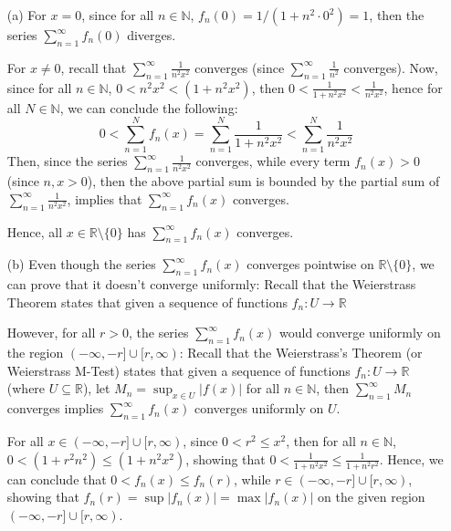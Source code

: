 \documentclass{article}
\begin{document}
\begin{itemize}
    \item[(a)] For $x=0$, since for all $n\in\mathbb{N}$, $f_n(0)=1/(1+n^2\cdot 0^2)=1$, then the series $\sum_{n=1}^{\infty} f_n(0)$ diverges.
    
    \hfill
    
    For $x\neq 0$, recall that $\sum_{n=1}^{\infty}\frac{1}{n^2x^2}$ converges (since $\sum_{n=1}^{\infty}\frac{1}{n^2}$ converges).
    Now, since for all $n\in\mathbb{N}$, $0< n^2x^2 < (1+n^2x^2)$, then $0<\frac{1}{1+n^2x^2}<\frac{1}{n^2x^2}$, hence for all $N\in\mathbb{N}$, we can conclude the following:
    $$0 < \sum_{n=1}^{N}f_n(x)=\sum_{n=1}^{N}\frac{1}{1+n^2x^2}<\sum_{n=1}^{N}\frac{1}{n^2x^2}$$
    Then, since the series $\sum_{n=1}^{\infty}\frac{1}{n^2x^2}$ converges, while every term $f_n(x)>0$ (since $n,x>0$), then the above partial sum is bounded by the partial sum of $\sum_{n=1}^{\infty}\frac{1}{n^2x^2}$,
    implies that $\sum_{n=1}^{\infty}f_n(x)$ converges.

    Hence, all $x\in \mathbb{R}\setminus\{0\}$ has $\sum_{n=1}^{\infty}f_n(x)$ converges.
    
    \hfill
    
    \item[(b)] Even though the series $\sum_{n=1}^{\infty}f_n(x)$ converges pointwise on $\mathbb{R}\setminus\{0\}$, we can prove that it doesn't converge uniformly:
    Recall that the Weierstrass Theorem states that given a sequence of functions $f_n:U\rightarrow\mathbb{R}$

    \hfill

    However, for all $r>0$, the series $\sum_{n=1}^{\infty}f_n(x)$ would converge uniformly on the region $(-\infty,-r]\cup [r,\infty)$:
    Recall that the Weierstrass's Theorem (or Weierstrass M-Test) states that given a sequence of functions $f_n:U\rightarrow\mathbb{R}$ (where $U\subseteq \mathbb{R}$),
    let $M_n = \sup_{x\in U}|f(x)|$ for all $n\in\mathbb{N}$, then $\sum_{n=1}^{\infty}M_n$ converges implies $\sum_{n=1}^{\infty}f_n(x)$ converges uniformly on $U$.

    For all $x\in (-\infty,-r]\cup [r,\infty)$, since $0<r^2\leq x^2$, then for all $n\in\mathbb{N}$, $0<(1+r^2n^2)\leq (1+n^2x^2)$, showing that $0<\frac{1}{1+n^2x^2}\leq \frac{1}{1+n^2r^2}$.
    Hence, we can conclude that $0<f_n(x)\leq f_n(r)$, while $r\in (-\infty,-r]\cup [r,\infty)$, showing that $f_n(r)=\sup|f_n(x)| = \max|f_n(x)|$ on the given region $(-\infty,-r]\cup [r,\infty)$.


\end{itemize}
\end{document}
